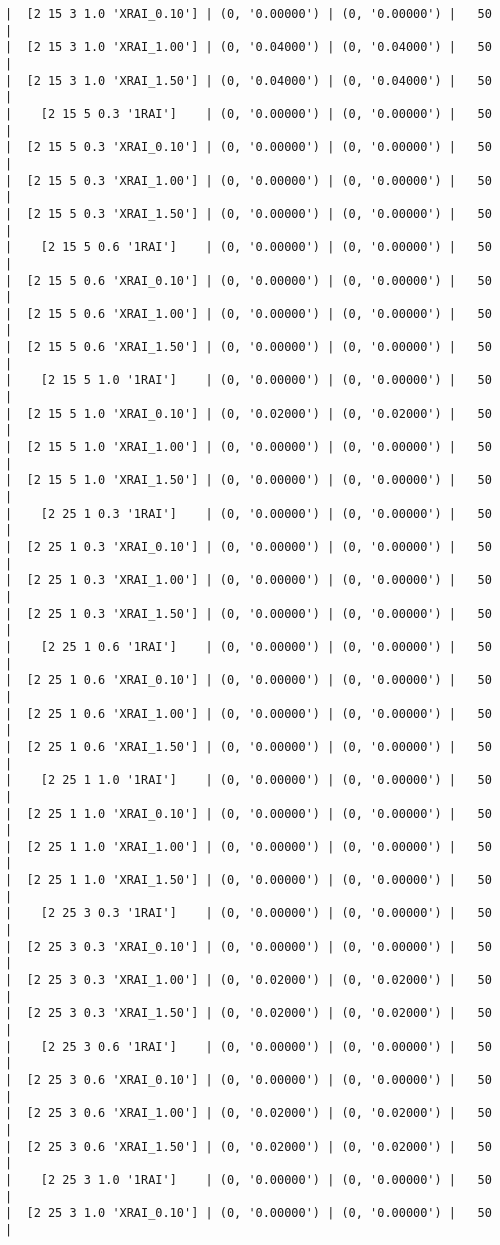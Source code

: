 \documentclass{article}
\begin{document}
\begin{verbatim}
|  [2 15 3 1.0 'XRAI_0.10'] | (0, '0.00000') | (0, '0.00000') |   50  |
|  [2 15 3 1.0 'XRAI_1.00'] | (0, '0.04000') | (0, '0.04000') |   50  |
|  [2 15 3 1.0 'XRAI_1.50'] | (0, '0.04000') | (0, '0.04000') |   50  |
|    [2 15 5 0.3 '1RAI']    | (0, '0.00000') | (0, '0.00000') |   50  |
|  [2 15 5 0.3 'XRAI_0.10'] | (0, '0.00000') | (0, '0.00000') |   50  |
|  [2 15 5 0.3 'XRAI_1.00'] | (0, '0.00000') | (0, '0.00000') |   50  |
|  [2 15 5 0.3 'XRAI_1.50'] | (0, '0.00000') | (0, '0.00000') |   50  |
|    [2 15 5 0.6 '1RAI']    | (0, '0.00000') | (0, '0.00000') |   50  |
|  [2 15 5 0.6 'XRAI_0.10'] | (0, '0.00000') | (0, '0.00000') |   50  |
|  [2 15 5 0.6 'XRAI_1.00'] | (0, '0.00000') | (0, '0.00000') |   50  |
|  [2 15 5 0.6 'XRAI_1.50'] | (0, '0.00000') | (0, '0.00000') |   50  |
|    [2 15 5 1.0 '1RAI']    | (0, '0.00000') | (0, '0.00000') |   50  |
|  [2 15 5 1.0 'XRAI_0.10'] | (0, '0.02000') | (0, '0.02000') |   50  |
|  [2 15 5 1.0 'XRAI_1.00'] | (0, '0.00000') | (0, '0.00000') |   50  |
|  [2 15 5 1.0 'XRAI_1.50'] | (0, '0.00000') | (0, '0.00000') |   50  |
|    [2 25 1 0.3 '1RAI']    | (0, '0.00000') | (0, '0.00000') |   50  |
|  [2 25 1 0.3 'XRAI_0.10'] | (0, '0.00000') | (0, '0.00000') |   50  |
|  [2 25 1 0.3 'XRAI_1.00'] | (0, '0.00000') | (0, '0.00000') |   50  |
|  [2 25 1 0.3 'XRAI_1.50'] | (0, '0.00000') | (0, '0.00000') |   50  |
|    [2 25 1 0.6 '1RAI']    | (0, '0.00000') | (0, '0.00000') |   50  |
|  [2 25 1 0.6 'XRAI_0.10'] | (0, '0.00000') | (0, '0.00000') |   50  |
|  [2 25 1 0.6 'XRAI_1.00'] | (0, '0.00000') | (0, '0.00000') |   50  |
|  [2 25 1 0.6 'XRAI_1.50'] | (0, '0.00000') | (0, '0.00000') |   50  |
|    [2 25 1 1.0 '1RAI']    | (0, '0.00000') | (0, '0.00000') |   50  |
|  [2 25 1 1.0 'XRAI_0.10'] | (0, '0.00000') | (0, '0.00000') |   50  |
|  [2 25 1 1.0 'XRAI_1.00'] | (0, '0.00000') | (0, '0.00000') |   50  |
|  [2 25 1 1.0 'XRAI_1.50'] | (0, '0.00000') | (0, '0.00000') |   50  |
|    [2 25 3 0.3 '1RAI']    | (0, '0.00000') | (0, '0.00000') |   50  |
|  [2 25 3 0.3 'XRAI_0.10'] | (0, '0.00000') | (0, '0.00000') |   50  |
|  [2 25 3 0.3 'XRAI_1.00'] | (0, '0.02000') | (0, '0.02000') |   50  |
|  [2 25 3 0.3 'XRAI_1.50'] | (0, '0.02000') | (0, '0.02000') |   50  |
|    [2 25 3 0.6 '1RAI']    | (0, '0.00000') | (0, '0.00000') |   50  |
|  [2 25 3 0.6 'XRAI_0.10'] | (0, '0.00000') | (0, '0.00000') |   50  |
|  [2 25 3 0.6 'XRAI_1.00'] | (0, '0.02000') | (0, '0.02000') |   50  |
|  [2 25 3 0.6 'XRAI_1.50'] | (0, '0.02000') | (0, '0.02000') |   50  |
|    [2 25 3 1.0 '1RAI']    | (0, '0.00000') | (0, '0.00000') |   50  |
|  [2 25 3 1.0 'XRAI_0.10'] | (0, '0.00000') | (0, '0.00000') |   50  |

\end{verbatim}
\end{document}
